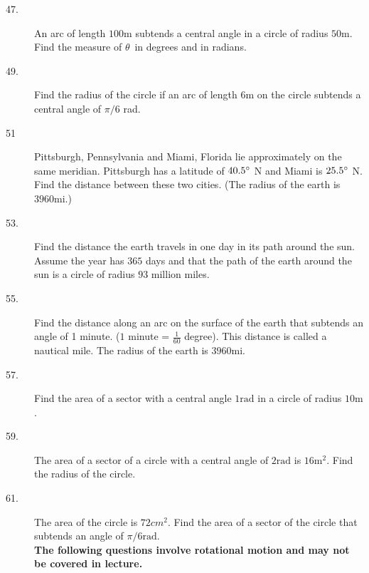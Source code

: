 \begin{description}
\item [47.]
An arc of length $100 \mbox{m}$ subtends a central angle in
a circle of radius $50 \mbox{m}$. Find the measure of $\theta $\ in degrees and in radians. 

\item [49.]
Find the radius of the circle if an arc of length $6 \mbox{m}$ on the circle subtends a central angle of $\pi /6$ rad. 

\item [51] Pittsburgh, Pennsylvania
and Miami, Florida lie approximately on the same meridian. Pittsburgh has a latitude of $40.5 \mbox{{\ensuremath{{}^\circ}}}$ N and Miami is $25.5 \mbox{{\ensuremath{{}^\circ}}}$ N. Find the distance between these two cities. (The
radius of the earth is $3960 \mbox{mi}\text{.}$) 

\item [53.] Find the distance
the earth travels in one day in its path around the sun. Assume the year has $365$ days and that the path of the earth around the sun is a circle of radius $93$ million miles. 

\item [55.] Find
the distance along an arc on the surface of the earth that subtends an angle of 1 minute. ($1$ minute = $\frac{1}{60}$ degree). This distance is called a nautical mile. The
radius of the earth is $3960 \mbox{mi}\text{.}$ 

\item [57.] Find the area
of a sector with a central angle $1 \mbox{rad}$ in a circle of radius $10 \mbox{m}$. 

\item [59.]
The area of a sector of a circle with a central angle of $2 \mbox{rad}$ is $16 \mathrm{m}^{2}$. Find the radius of the circle. 

\item [61.]
The area of the circle is $72 cm^{2}$. Find the area of a sector of the circle that subtends an angle of $\pi /6 \mbox{rad}\text{.}$ \\

\textbf{The following questions involve rotational motion and may not be covered in lecture.}

\columnsep =30pt
\end{description}
